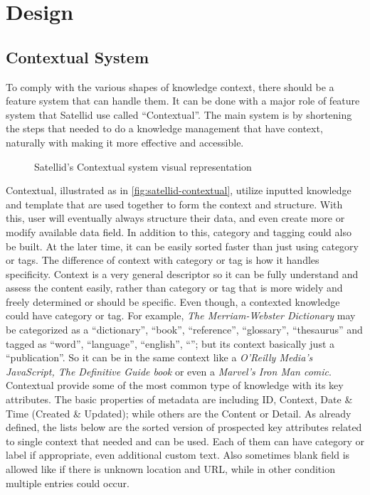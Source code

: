 \section{Design}
\label{sec:design}

\subsection{Contextual System}

To comply with the various shapes of knowledge context, there should be a feature system that can handle them.
It can be done with a major role of feature system that Satellid use called ``Contextual''.
The main system is by shortening the steps that needed to do a knowledge management that have context, naturally with making it more effective and accessible.

\begin{figure}[htb]
    \centering
    \caption{Satellid's Contextual system visual representation}
    \label{fig:satellid-contextual}
\end{figure}

Contextual, illustrated as in \autoref{fig:satellid-contextual}, utilize inputted knowledge and template that are used together to form the context and structure.
With this, user will eventually always structure their data, and even create more or modify available data field.
In addition to this, category and tagging could also be built.
At the later time, it can be easily sorted faster than just using category or tags.
The difference of context with category or tag is how it handles specificity.
Context is a very general descriptor so it can be fully understand and assess the content easily, rather than category or tag that is more widely and freely determined or should be specific.
Even though, a contexted knowledge could have category or tag.
For example, \textit{The Merriam-Webster Dictionary} may be categorized as a ``dictionary'', ``book'', ``reference'', ``glossary'', ``thesaurus'' and tagged as ``word'', ``language'', ``english'', ``''; but its context basically just a ``publication''.
So it can be in the same context like a \textit{O'Reilly Media's JavaScript, The Definitive Guide book} or even a \textit{Marvel's Iron Man comic}.
Contextual provide some of the most common type of knowledge with its key attributes.
The basic properties of metadata are including ID, Context, Date \& Time (Created \& Updated); while others are the Content or Detail.
As already defined, the lists below are the sorted version of prospected key attributes related to single context that needed and can be used.
Each of them can have category or label if appropriate, even additional custom text.
Also sometimes blank field is allowed like if there is unknown location and URL, while in other condition multiple entries could occur.

